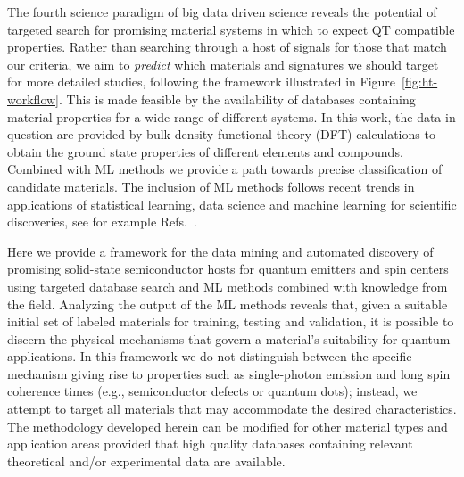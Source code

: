 \documentclass[superscriptaddress,unsortedaddress,
 amsmath,amssymb,
 aps,
]{revtex4-2}
\begin{document}
The fourth science paradigm of big data driven science reveals the potential of targeted search for promising material systems in which to expect QT compatible properties. 
Rather than searching through a host of signals for those that match our criteria, we aim to \textit{predict} which materials and signatures we should target for more detailed studies, following the framework illustrated in Figure~\ref{fig:ht-workflow}. 
This is made feasible by the availability of databases containing material properties for a wide range of different systems. In this work, the data in question are provided by bulk density functional theory (DFT) calculations to obtain the ground state properties of different elements and compounds. Combined with ML methods we provide a path towards precise classification of candidate materials. The inclusion of ML methods follows recent trends in applications of statistical learning, data science and machine learning for scientific discoveries, see for example Refs.~\cite{deiana2021,Carleo2019}. 

Here we provide a framework for the data mining and automated discovery of promising solid-state semiconductor hosts for quantum emitters and spin centers using targeted database search and ML methods combined with knowledge from the field. 
Analyzing the output of the ML methods reveals that, given a suitable initial set of labeled materials for training, testing and validation, it is possible to discern the physical mechanisms that govern a material's suitability for quantum applications.  
In this framework we do not distinguish between the specific mechanism giving rise to properties such as single-photon emission and long spin coherence times (e.g., semiconductor defects or quantum dots); instead, we attempt to target all materials that may accommodate the desired characteristics.  
The methodology developed herein can be modified for other material types and application areas provided that high quality databases containing relevant theoretical and/or experimental data are available. 
\end{document}
